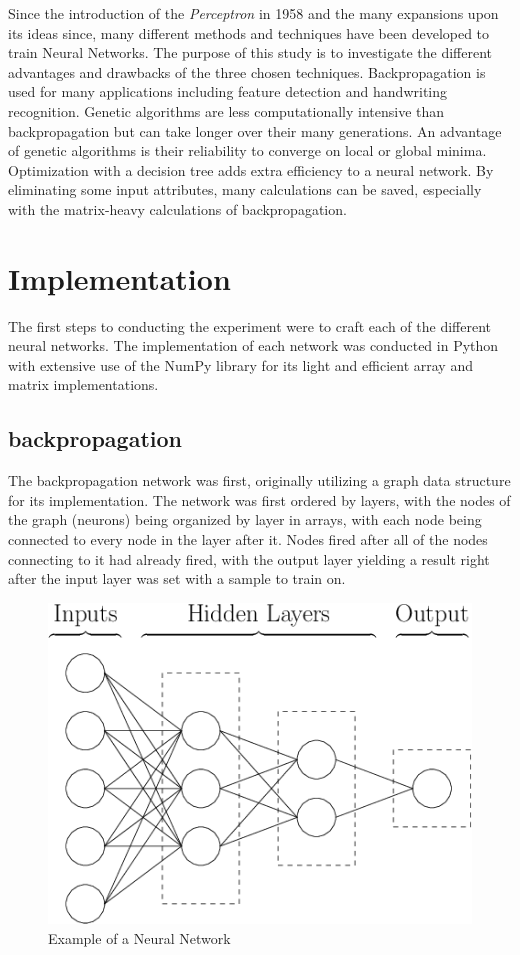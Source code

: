 \documentclass[12pt]{article}
\begin{document}
    Since the introduction of the \textit{Perceptron} in 1958 and the many expansions upon its
    ideas since, many different methods and techniques have been developed to train Neural Networks.  The purpose of
    this study is to investigate the different advantages and drawbacks of the three chosen techniques.  
    Backpropagation is used for many applications
    including feature detection and handwriting recognition.  Genetic algorithms are less computationally intensive than backpropagation
    but can take longer over their many generations.  An advantage of genetic algorithms is their reliability to converge on local or
    global minima.  Optimization with a decision tree adds extra efficiency to a neural network.  By eliminating some input attributes, many calculations
    can be saved, especially with the matrix-heavy calculations of backpropagation.
\section{Implementation}
    The first steps to conducting the experiment were to craft each of the different neural networks.  The implementation
    of each network was conducted in Python \cite{python} with extensive use of the NumPy \cite{numPy} library for its light and efficient
    array and matrix implementations.
    \subsection{backpropagation} 
        The backpropagation network was first, originally utilizing a graph data structure for its 
        implementation.  The network was first ordered by layers, with the nodes of the graph (neurons) 
        being organized by layer in arrays, with each node being connected to every node in the layer after it.  
        Nodes fired after all of the nodes connecting to it had already fired, with the output layer yielding a result right after the 
        input layer was set with a sample to train on.
        \begin{figure}[h]
            \includegraphics[scale=.3]{nnDiagram.png}
            \centering
            \caption{Example of a Neural Network \cite{nnDiagram}}
        \end{figure}
\end{document}

